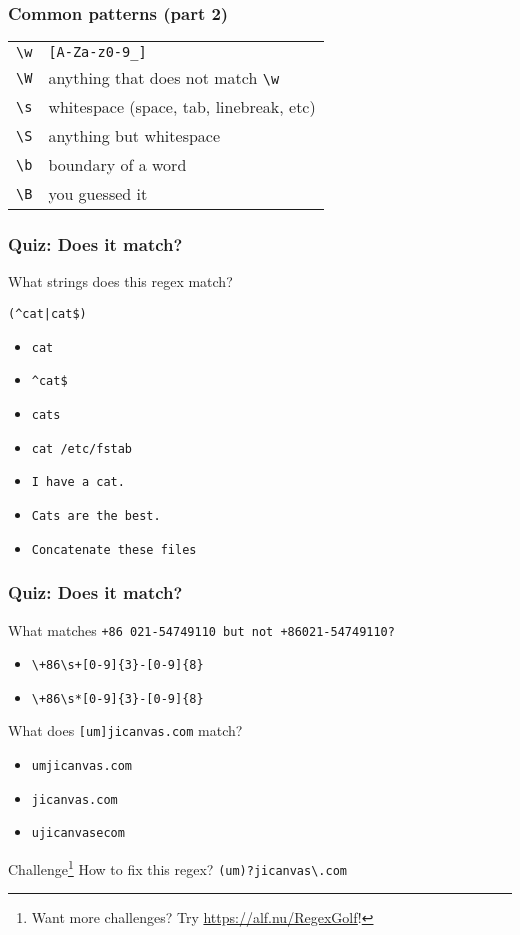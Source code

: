 \begin{frame}[fragile]
\frametitle{Common patterns (part 2)}
\begin{table}
    \centering
    \begin{tabular}{ll}
        \verb|\w|           & \verb|[A-Za-z0-9_]| \\
        \verb|\W|           & anything that does not match \verb|\w| \\
        \verb|\s|           & whitespace (space, tab, linebreak, etc) \\
        \verb|\S|           & anything but whitespace \\
        \verb|\b|           & boundary of a word \\
        \verb|\B|           & you guessed it
    \end{tabular}
\end{table}
\end{frame}

\begin{frame}[fragile]
\frametitle{Quiz: Does it match?}
What strings does this regex match? \newline

\Large \verb!(^cat|cat$)! \normalsize

\begin{itemize}
    \item \verb|cat|                      %
    \item \verb|^cat$|                    %
    \item \verb|cats|                     %
    \item \verb|cat /etc/fstab|           %
    \item \verb|I have a cat.|            %
    \item \verb|Cats are the best.|       %
    \item \verb|Concatenate these files|  %
\end{itemize}
\end{frame}

\begin{frame}[fragile]
\frametitle{Quiz: Does it match?}
What matches \tt{+86 021-54749110} but not \tt{+86021-54749110}?
\begin{itemize}
    \item \verb|\+86\s+[0-9]{3}-[0-9]{8}|
    \item \verb|\+86\s*[0-9]{3}-[0-9]{8}| %
\end{itemize}

What does \Large \verb|[um]jicanvas.com| \normalsize match?
\begin{itemize}
    \item \tt{umjicanvas.com}
    \item \tt{jicanvas.com}
    \item \tt{ujicanvasecom} %
\end{itemize}

\begin{block}{Challenge\footnote{Want more challenges? Try \url{https://alf.nu/RegexGolf}!}}
    How to fix this regex? \pause \verb|(um)?jicanvas\.com|
\end{block}
\end{frame}

